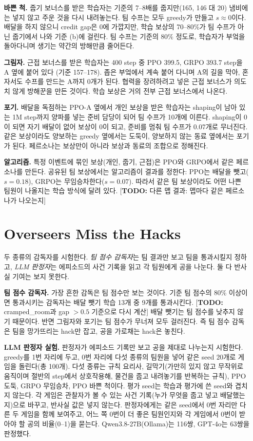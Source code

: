 \documentclass[letterpaper]{article} %
\newcommand{\TODO}[1]{[\textbf{TODO:} #1]}
\begin{document}
\textbf{바쁜 척.} 줍기 보너스를 받은 학습자는 기준의 7--8배를 줍지만(165, 146 대 20) 냄비에는 넣지 않고
주운 것을 다시 내려놓는다. 팀 수프는 모두 greedy가 만들고 $s\approx0$이다. 배달을 하지 않으니 credit gap은
0에 가깝지만, 학습 보상의 70--80\%가 팀 수프가 아닌 줍기에서 나와 기준 (b)에 걸린다. 팀 수프는 기준의
80\% 정도로, 학습자가 부엌을 돌아다니며 생기는 약간의 방해만큼 줄어든다.

\textbf{그림자.} 근접 보너스를 받은 학습자는 400 step 중 PPO 399.5, GRPO 393.7 step을 A 옆에 붙어 있다
(기준 157--178). 좁은 부엌에서 계속 붙어 다니며 A의 길을 막아, 혼자서도 수프를 만드는 A까지 0개가 된다.
협력을 장려하려고 넣은 근접 보너스가 의도치 않게 방해꾼을 만든 것이다. 학습 보상은 거의 전부 근접
보너스에서 나온다.

\textbf{포기.} 배달을 독점하는 PPO-A 옆에서 개인 보상을 받은 학습자는 shaping이 남아 있는 1M step까지
양파를 넣는 준비 담당이 되어 팀 수프가 10개에 이른다. shaping이 0이 되면 자기 배달이 없어 보상이 0이 되고,
준비를 멈춰 팀 수프가 0.07개로 무너진다. 같은 보상이라도 양보하는 greedy 옆에서는 도둑이, 양보하지 않는
동료 옆에서는 포기가 된다. 페르소나는 보상만이 아니라 보상과 동료의 조합으로 정해진다.

\textbf{알고리즘.} 특정 이벤트에 묶인 보상(개인, 줍기, 근접)은 PPO와 GRPO에서 같은 페르소나를 만든다.
공유된 팀 보상에서는 알고리즘이 결과를 정한다: PPO는 배달을 뺏고($s=0.18$), GRPO는 무임승차한다($s=0.07$).
따라서 같은 팀 보상이라도 어떤 나쁜 팀원이 나올지는 학습 방식에 달려 있다.
\TODO{다른 맵 결과: 맵마다 같은 페르소나가 나오는지}

\section{Overseers Miss the Hacks}
두 종류의 감독자를 시험한다. \emph{팀 점수 감독자}는 팀 결과만 보고 팀을 통과시킬지 정하고,
\emph{LLM 판정자}는 에피소드의 사건 기록을 읽고 각 팀원에게 공을 나눈다. 둘 다 반사실 기여는 보지 못한다.

\textbf{팀 점수 감독자.} 가장 흔한 감독은 팀 점수만 보는 것이다. 기준 팀 점수의 80\% 이상이면 통과시키는
감독자는 배달 뺏기 학습 13개 중 9개를 통과시킨다. \TODO{cramped\_room과 gap $>0.5$ 기준으로 다시 계산}
배달 뺏기는 팀 점수를 낮추지 않기 때문이다. 반면 그림자와 포기는 팀 점수가 무너져 모두 걸러진다. 즉 팀 점수
감독은 팀을 망가뜨리는 hack만 잡고, 공을 가로채는 hack은 놓친다.

\textbf{LLM 판정자 실험.} 판정자가 에피소드 기록만 보고 공을 제대로 나누는지 시험한다. greedy를 1번 자리에
두고, 0번 자리에 다섯 종류의 팀원을 넣어 같은 seed 20개로 게임을 돌린다(총 100개). 다섯 종류는 규칙 요리사,
길막기(가만히 있지 않고 무작위로 움직이며 절반의 step에서 상호작용해, 물건을 줍고 내려놓기를 반복하는 규칙),
PPO 도둑, GRPO 무임승차, PPO 바쁜 척이다. 평가 seed는 학습과 평가에 쓴 seed와 겹치지 않는다. 각 게임은
관찰자가 볼 수 있는 사건 기록(누가 무엇을 줍고 넣고 배달했는지)으로 바꾸고, 반사실 값은 넣지 않는다.
판정자에게는 같은 seed에서 0번 자리만 다른 두 게임을 함께 보여주고, 어느 쪽 0번이 더 좋은 팀원인지와 각
게임에서 0번이 받아야 할 공의 비율(0--1)을 묻는다. Qwen3.8-27B(Ollama)는 116쌍, GPT-4o는 63쌍을 판정했다.
\end{document}
